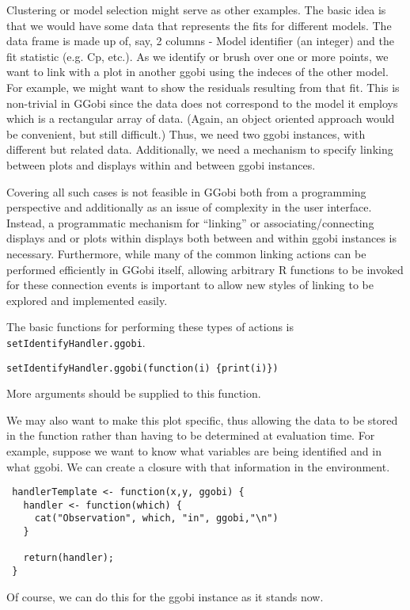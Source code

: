 \documentclass{article}
\def\SFunction#1{{\texttt{\red #1}}}
\begin{document}
Clustering or model selection might serve as other examples.  The
basic idea is that we would have some data that represents the fits
for different models.  The data frame is made up of, say, 2 columns -
Model identifier (an integer) and the fit statistic (e.g. Cp, etc.).
As we identify or brush over one or more points, we want to link with
a plot in another ggobi using the indeces of the other model.  For
example, we might want to show the residuals resulting from that fit.
This is non-trivial in GGobi since the data does not correspond to the
model it employs which is a rectangular array of data.  (Again, an
object oriented approach would be convenient, but still difficult.)
Thus, we need two ggobi instances, with different but related data.
Additionally, we need a mechanism to specify linking between plots and
displays within and between ggobi instances.

Covering all such cases is not feasible in GGobi both from a
programming perspective and additionally as an issue of complexity in
the user interface.  Instead, a programmatic mechanism for ``linking''
or associating/connecting displays and or plots within displays both
between and within ggobi instances is necessary.  Furthermore, while
many of the common linking actions can be performed efficiently in
GGobi itself, allowing arbitrary R functions to be invoked for these
connection events is important to allow new styles of linking to be
explored and implemented easily.


The basic functions for performing these types of actions
is \SFunction{setIdentifyHandler.ggobi}.
\begin{verbatim}
setIdentifyHandler.ggobi(function(i) {print(i)})
\end{verbatim}
More arguments should be supplied to this function. 

We may also want to make this plot specific, thus allowing the data to
be stored in the function rather than having to be determined at
evaluation time. For example, suppose we want to know what variables
are being identified and in what ggobi.  We can create a closure with
that information in the environment.
\begin{verbatim}
 handlerTemplate <- function(x,y, ggobi) {
   handler <- function(which) {
     cat("Observation", which, "in", ggobi,"\n")    
   }

   return(handler);
 }
\end{verbatim}
Of course, we can do this for the ggobi instance
as it stands now.
\end{document}
